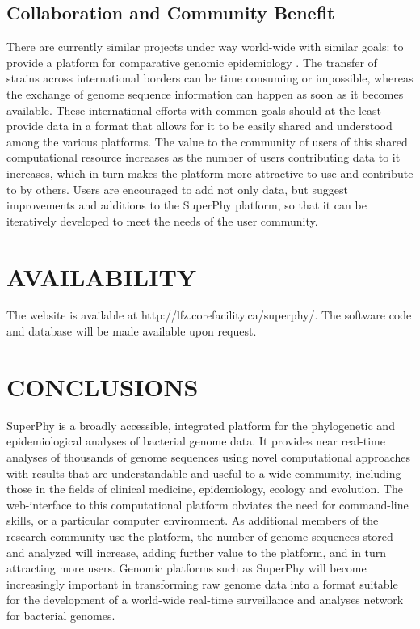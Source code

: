 \documentclass[a4paper,twoside]{article}
\begin{document}
\subsection{Collaboration and Community Benefit}
\label{sec:collaboration}
There are currently similar projects under way world-wide with similar goals: to provide a platform for comparative genomic epidemiology \cite{kupferschmidt_outbreak_2011}. The transfer of strains across international borders can be time consuming or impossible, whereas the exchange of genome sequence information can happen as soon as it becomes available. These international efforts with common goals should at the least provide data in a format that allows for it to be easily shared and understood among the various platforms. The value to the community of users of this shared computational resource increases as the number of users contributing data to it increases, which in turn makes the platform more attractive to use and contribute to by others. Users are encouraged to add not only data, but suggest improvements and additions to the SuperPhy platform, so that it can be iteratively developed to meet the needs of the user community.

\section{\uppercase{Availability}}
\label{sec:availability}

The website is available at http://lfz.corefacility.ca/superphy/. The software code and database will be made available upon request.

\section{\uppercase{Conclusions}}
\label{sec:conclusion}

\noindent SuperPhy is a broadly accessible, integrated platform for the phylogenetic and epidemiological analyses of bacterial genome data. It provides near real-time analyses of thousands of genome sequences using novel computational approaches with results that are understandable and useful to a wide community, including those in the fields of clinical medicine, epidemiology, ecology and evolution. The web-interface to this computational platform obviates the need for command-line skills, or a particular computer environment. As additional members of the research community use the platform, the number of genome sequences stored and analyzed will increase, adding further value to the platform, and in turn attracting more users. Genomic platforms such as SuperPhy will become increasingly important in transforming raw genome data into a format suitable for the development of a world-wide real-time surveillance and analyses network for bacterial genomes.

\vfill

{\small
}

\vfill
\end{document}
